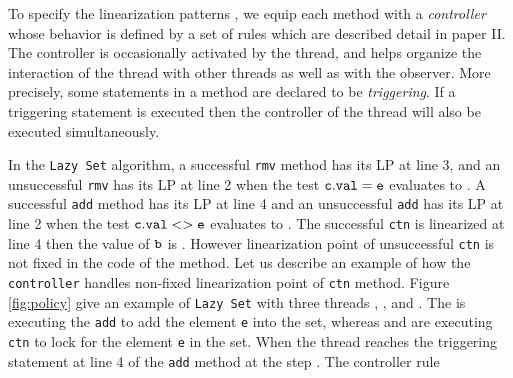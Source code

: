 %
 

To specify the linearization patterns , we equip each method with a
{\it controller} whose behavior is defined by a set of rules which are described detail in paper II.
%
The controller is occasionally activated by the thread,
and helps organize the interaction  
of the thread with other threads as well as with the observer.
%
More precisely, some 
statements in a  method are declared to be {\it triggering}. If a triggering statement is executed then 
the controller of the thread will also be executed simultaneously.  

%
In the {\tt Lazy Set} algorithm, a successful {\tt rmv} method has its LP at line 3, and an unsuccessful {\tt rmv} has its LP at line 2 when the test $\tt c.val = e$ evaluates to \false. A successful {\tt add} method has its LP at line 4 and an unsuccessful {\tt add} has its LP at line 2 when the test $\tt c.val <> e$ evaluates to \false\;. The successful {\tt ctn} is linearized at line 4 then the value of $\tt b$ is \true. However linearization point of unsuccessful {\tt ctn} is not fixed in the code of the method.
 Let us describe an example of how the {\tt controller} handles non-fixed linearization point of {\tt ctn} method. Figure \ref{fig:policy} give an example of {\tt Lazy Set} with three threads \threada\;, \threadb\;, and \threadc. The \threada \; is executing the {\tt add} to add the element {\tt e} into the set, whereas \threadb\; and \threadc\; are executing {\tt ctn} to lock for the element {\tt e} in the set. When the thread \threada\; reaches the triggering statement at line 4 of the {\tt add} method at the step \;\stepa\;. The controller rule 
